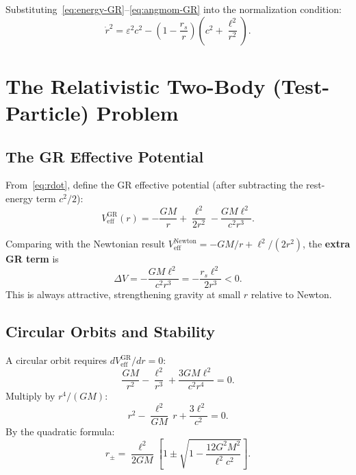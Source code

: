 \documentclass[12pt,a4paper]{article}
\theoremstyle{plain}
\theoremstyle{definition}
\theoremstyle{remark}
\newcommand{\leff}{\ell}  %
\begin{document}
Substituting~\eqref{eq:energy-GR}--\eqref{eq:angmom-GR} into the normalization condition:
\begin{equation}\label{eq:rdot}
  \boxed{\dot{r}^2 = \varepsilon^2 c^2 - \left(1-\frac{r_s}{r}\right)\!\left(c^2+\frac{\leff^2}{r^2}\right).}
\end{equation}

\section{The Relativistic Two-Body (Test-Particle) Problem}

\subsection{The GR Effective Potential}

From~\eqref{eq:rdot}, define the GR effective potential (after subtracting the rest-energy term $c^2/2$):
\begin{equation}\label{eq:Veff-GR}
  V_{\mathrm{eff}}^{\mathrm{GR}}(r)
  = -\frac{GM}{r} + \frac{\leff^2}{2r^2} - \frac{GM\leff^2}{c^2 r^3}.
\end{equation}

Comparing with the Newtonian result $V_{\mathrm{eff}}^{\mathrm{Newton}} = -GM/r + \leff^2/(2r^2)$, the \textbf{extra GR term} is
\[
  \Delta V = -\frac{GM\leff^2}{c^2 r^3} = -\frac{r_s\leff^2}{2r^3} < 0.
\]
This is always attractive, strengthening gravity at small $r$ relative to Newton.

\subsection{Circular Orbits and Stability}

A circular orbit requires $dV_{\mathrm{eff}}^{\mathrm{GR}}/dr = 0$:
\[
  \frac{GM}{r^2} - \frac{\leff^2}{r^3} + \frac{3GM\leff^2}{c^2r^4} = 0.
\]
Multiply by $r^4/(GM)$:
\begin{equation}\label{eq:circ-quad}
  r^2 - \frac{\leff^2}{GM}\,r + \frac{3\leff^2}{c^2} = 0.
\end{equation}
By the quadratic formula:
\[
  r_\pm = \frac{\leff^2}{2GM}\!\left[1\pm\sqrt{1-\frac{12G^2M^2}{\leff^2 c^2}}\right].
\]
\end{document}
